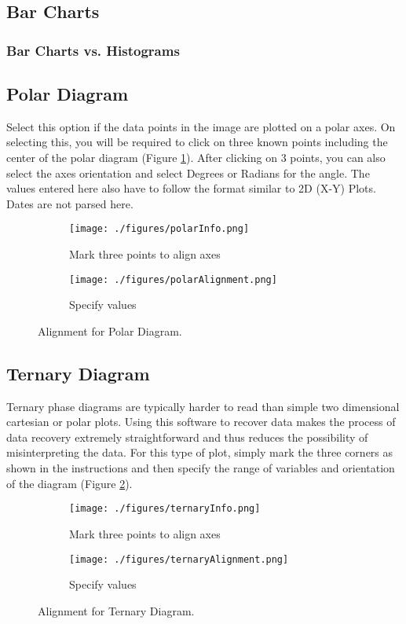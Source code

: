 \documentclass[letterpaper, 10pt]{article}
\begin{document}
\subsection{Bar Charts}

\subsubsection{Bar Charts vs. Histograms}

\subsection{Polar Diagram}
Select this option if the data points in the image are plotted on a polar axes. On selecting this, you will be required to click on three known points including the center of the polar diagram (Figure \ref{fig:polarAlignment}). After clicking on 3 points, you can also select the axes orientation and select Degrees or Radians for the angle. The values entered here also have to follow the format similar to 2D (X-Y) Plots. Dates are not parsed here.

\begin{figure}
\centering
{\begin{subfigure}[b]{0.4\textwidth}
\texttt{[image: ./figures/polarInfo.png]}
\caption{Mark three points to align axes}
\end{subfigure}
\begin{subfigure}[b]{0.3\textwidth}
\texttt{[image: ./figures/polarAlignment.png]}
\caption{Specify values}
\end{subfigure}}
\caption{Alignment for Polar Diagram.}
\label{fig:polarAlignment}
\end{figure}
 
\subsection{Ternary Diagram}
Ternary phase diagrams are typically harder to read than simple two dimensional cartesian or polar plots. Using this software to recover data makes the process of data recovery extremely straightforward and thus reduces the possibility of misinterpreting the data. For this type of plot, simply mark the three corners as shown in the instructions and then specify the range of variables and orientation of the diagram (Figure \ref{fig:ternaryAlignment}).

\begin{figure}
\centering
{\begin{subfigure}[b]{0.4\textwidth}
\texttt{[image: ./figures/ternaryInfo.png]}
\caption{Mark three points to align axes}
\end{subfigure}
\begin{subfigure}[b]{0.4\textwidth}
\texttt{[image: ./figures/ternaryAlignment.png]}
\caption{Specify values}
\end{subfigure}}
\caption{Alignment for Ternary Diagram.}
\label{fig:ternaryAlignment}
\end{figure}
\end{document}
